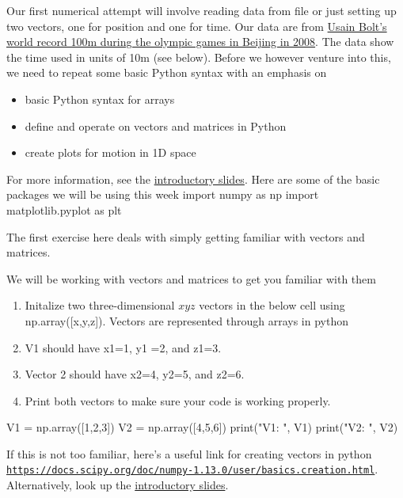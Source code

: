 \documentclass[%
oneside,                 %
final,                   %
10pt]{article}
\begin{document}
Our first numerical attempt will involve reading data from file or
just setting up two vectors, one for position and one for time. Our data are from 
\href{{https://www.youtube.com/watch?v=93dC0o2aHto}}{Usain Bolt's world record 100m during the olympic games in Beijing in
2008}. The data show the time used in units of 10m (see below). Before we however
venture into this, we need to repeat some basic Python syntax with an
emphasis on

\begin{itemize}
\item basic Python syntax for arrays

\item define and operate on vectors and matrices in Python

\item create plots for motion in 1D space
\end{itemize}

\noindent
For more information, see the \href{{https://mhjensen.github.io/Physics321/doc/pub/Introduction/html/Introduction.html}}{introductory slides}.
Here are some of the basic packages we will be using this week
\bpycod
import numpy as np 
import matplotlib.pyplot as plt
\epycod


The first exercise here deals with simply getting familiar with vectors and matrices.

We will be working with vectors and matrices to get you familiar with them

\begin{enumerate}
\item Initalize two three-dimensional $xyz$ vectors in the below cell using np.array([x,y,z]). Vectors are represented through arrays in python

\item V1 should have x1=1, y1 =2, and z1=3. 

\item Vector 2 should have x2=4, y2=5,  and z2=6. 

\item Print both vectors to make sure your code is working properly.
\end{enumerate}

\noindent
\bpycod
V1 = np.array([1,2,3])
V2 = np.array([4,5,6])
print("V1: ", V1)
print("V2: ", V2)
\epycod

If this is not too familiar, here's a useful link for creating vectors in python \href{{https://docs.scipy.org/doc/numpy-1.13.0/user/basics.creation.html}}{\nolinkurl{https://docs.scipy.org/doc/numpy-1.13.0/user/basics.creation.html}}. Alternatively, look up the \href{{https://mhjensen.github.io/Physics321/doc/pub/Introduction/html/Introduction.html}}{introductory slides}.
\end{document}
